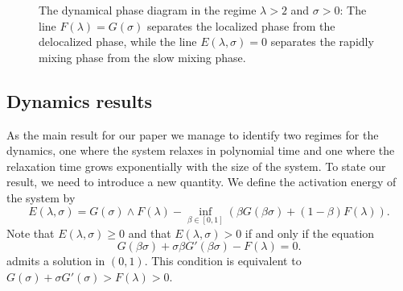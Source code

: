 \documentclass[reqno,11pt]{amsart}
\numberwithin{equation}{section}
\newcommand{\gl}{\lambda}
\newcommand{\gs}{\sigma}
\newcommand{\tf}{\textsc{f}}
\begin{document}
\begin{figure}[h]
  \caption{The dynamical phase diagram  in the regime $\gl>2$ and $\gs>0$:  
  The  line $F(\gl)=G(\gs)$ separates the localized phase from the delocalized phase, while the  line 
  $E(\gl,\gs)=0$ separates the rapidly mixing phase from the slow mixing phase.
  } \label{fig:dynamicdiagram}
\end{figure}











 \subsection{Dynamics results}
As the main result for our paper
 we manage to identify two regimes for the dynamics, one where 
 the system relaxes in polynomial time 
 and one where the relaxation time grows exponentially with the size of the system.
 To state our result, we need to introduce a new quantity. 
We define the activation energy of the system by  
 \begin{equation}\label{def:actienergy}
 E(\gl,\sigma)= G(\sigma)\wedge F(\gl)-\inf_{\beta\in[0,1]}\left(\beta G(\beta \sigma)+(1-\beta )F(\lambda)\right).
\end{equation}
 Note that  $E(\gl,\sigma)\ge 0$ and that  $E(\gl,\sigma)>0$ if and only if the equation
\begin{equation}
G(\beta \sigma)+\sigma \beta G'(\beta \sigma)-F(\lambda)=0. \label{defbetastar}
\end{equation}
admits a solution in $(0,1)$.
This condition is equivalent to $G(\sigma)+\sigma G'(\sigma)>  F(\lambda)>0$.
\end{document}
